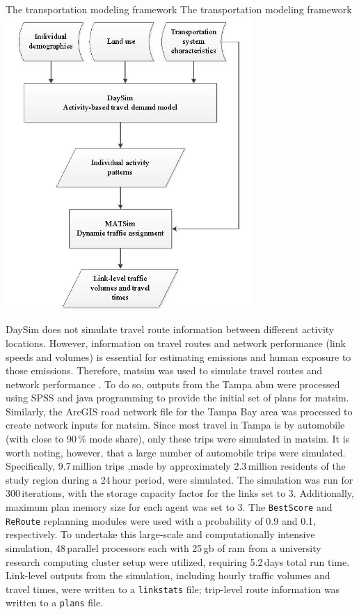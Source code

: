\createfigure%
{The transportation modeling framework}%
{The transportation modeling framework}%
{\label{fig:tampa-fig2}}%
{\includegraphics[width=0.7\textwidth, angle=0]{./scenarios/figures/tampa-fig2.jpg}}%
{}

DaySim does not simulate travel route information between different activity locations. 
However, information on travel routes and network performance (\ie link speeds and volumes) is essential for estimating emissions and human exposure to those emissions. 
Therefore, \gls{matsim} was used to simulate travel routes and network performance \citep[][]{BalmerEtAl_TRBTDF_2008}. 
To do so, outputs from the Tampa \gls{abm} were processed using SPSS and \gls{java} programming to provide the initial set of plans for \gls{matsim}. 
Similarly, the ArcGIS road network file for the Tampa Bay area was processed to create network inputs for \gls{matsim}. 
Since most travel in Tampa is by automobile (with close to 90\,\% mode share), only these trips were simulated in \gls{matsim}. 
It is worth noting, however, that a large number of automobile trips were simulated. 
Specifically, 9.7\,million trips ,made by approximately 2.3\,million residents of the study region during a 24\,hour period, were simulated. 
The simulation was run for 300\,iterations, with the storage capacity factor for the links set to 3. 
Additionally, maximum plan memory size for each agent was set to 3. The \lstinline|BestScore| and \lstinline|ReRoute| replanning modules were used with a probability of 0.9 and 0.1, respectively. 
To undertake this large-scale and computationally intensive simulation, 48\,parallel processors each with 25\,\gls{gb} of \gls{ram} from a university research computing cluster setup were utilized, requiring 5.2\,days total run time. 
Link-level outputs from the simulation, including hourly traffic volumes and travel times, were written to a \lstinline|linkstats| file;  trip-level route information was written to a \lstinline|plans| file.

